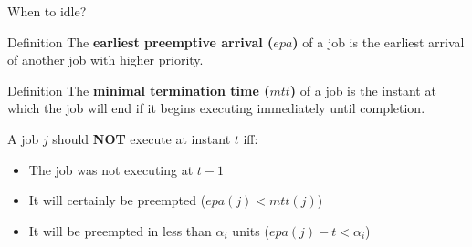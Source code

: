 \documentclass{beamer}
\begin{document}



\begin{frame}{When to idle?}
    \begin{block}{Definition}
        The \textbf{earliest preemptive arrival ($epa$)} of a job is the earliest arrival of another job with higher priority.
    \end{block}

    \begin{block}{Definition}
        The \textbf{minimal termination time ($mtt$)} of a job is the instant at which the job will end if it begins executing immediately until completion.
    \end{block}

    A job $j$ should \textbf{NOT} execute at instant $t$ iff:
    \begin{itemize}
        \item The job was not executing at $t-1$
        \item It will certainly be preempted ($epa(j) < mtt(j)$)
        \item It will be preempted in less than $\alpha_i$ units ($epa(j) - t < \alpha_i$)
    \end{itemize}
\end{frame}
\end{document}
